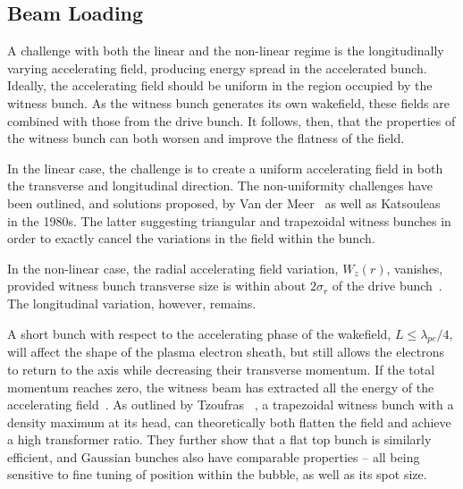 \subsection{Beam Loading}
\label{Int:BPI:BLoad}

A challenge with both the linear and the non-linear regime is the longitudinally varying accelerating field, producing energy spread in the accelerated bunch. Ideally, the accelerating field should be uniform in the region occupied by the witness bunch. As the witness bunch generates its own wakefield, these fields are combined with those from the drive bunch. It follows, then, that the properties of the witness bunch can both worsen and improve the flatness of the field.


In the linear case, the challenge is to create a uniform accelerating field in both the transverse and longitudinal direction. The non-uniformity challenges have been outlined, and solutions proposed, by Van der Meer~\cite{van_der_meer:1985} as well as Katsouleas \etal~\cite{katsouleas:1987} in the 1980s. The latter suggesting triangular and trapezoidal witness bunches in order to exactly cancel the variations in the field within the bunch.

In the non-linear case, the radial accelerating field variation, $W_{z}(r)$, vanishes, provided witness bunch transverse size is within about $2\sigma_{r}$ of the drive bunch~\cite{rosenzweig:1991}. The longitudinal variation, however, remains.

A short bunch with respect to the accelerating phase of the wakefield, $L \leq \lambda_{pe}/4$, will affect the shape of the plasma electron sheath, but still allows the electrons to return to the axis while decreasing their transverse momentum. If the total momentum reaches zero, the witness beam has extracted all the energy of the accelerating field~\cite{lu:2006a,lu:2006}. As outlined by Tzoufras \etal~\cite{tzoufras:2009}, a trapezoidal witness bunch with a density maximum at its head, can theoretically both flatten the field and achieve a high transformer ratio. They further show that a flat top bunch is similarly efficient, and Gaussian bunches also have comparable properties -- all being sensitive to fine tuning of position within the bubble, as well as its spot size.

